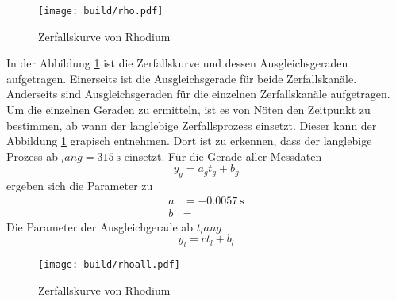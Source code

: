 \begin{figure}
    \centering
    \caption{Zerfallskurve von Rhodium}
    \label{fig:rho}
    \texttt{[image: build/rho.pdf]}
\end{figure}
In der Abbildung \ref{fig:rho} ist die Zerfallskurve und dessen Ausgleichsgeraden aufgetragen. 
Einerseits ist die Ausgleichsgerade für beide Zerfallskanäle. 
Anderseits sind Ausgleichsgeraden für die einzelnen Zerfallskanäle aufgetragen.
Um die einzelnen Geraden zu ermitteln, ist es von Nöten den Zeitpunkt zu bestimmen, ab wann der langlebige Zerfallsprozess einsetzt.
Dieser kann der Abbildung \ref{fig:rho} grapisch entnehmen.
Dort ist zu erkennen, dass der langlebige Prozess ab $_lang = \SI{315}{\second}$ einsetzt.
Für die Gerade aller Messdaten 
\begin{equation}
    y_g = a_g t_g + b_g
\end{equation}
ergeben sich die Parameter zu 
\begin{align*}
    a &= \SI{-0.0057}{\second} \\
    b &= \SI{}{}
\end{align*}
Die Parameter der Ausgleichgerade ab $t_lang$
\begin{equation}
    y_l = c t_l + b_l
\end{equation}
\begin{figure}
    \centering
    \caption{Zerfallskurve von Rhodium}
    \label{fig:rhoall}
    \texttt{[image: build/rhoall.pdf]}
\end{figure}